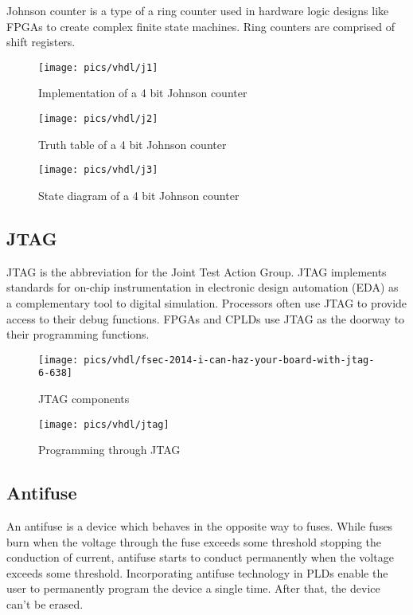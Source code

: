 \noindent
Johnson counter is a type of a ring counter used in hardware logic designs like FPGAs to create complex finite state machines. Ring counters are comprised of shift registers.

\begin{figure}[!h]
	\centering
	\texttt{[image: pics/vhdl/j1]}
	\caption{Implementation of a 4 bit Johnson counter}
	\label{fig:j1}
\end{figure}

\begin{figure}[!h]
	\centering
	\texttt{[image: pics/vhdl/j2]}
	\caption{Truth table of a 4 bit Johnson counter }
	\label{fig:j2}
\end{figure}

\begin{figure}[!h]
	\centering
	\texttt{[image: pics/vhdl/j3]}
	\caption{State diagram of a 4 bit Johnson counter}
	\label{fig:j3}
\end{figure}

\pagebreak

\subsection{JTAG}

\noindent
JTAG is the abbreviation for the Joint Test Action Group. JTAG implements standards for on-chip instrumentation in electronic design automation (EDA) as a complementary tool to digital simulation. Processors often use JTAG to provide access to their debug functions. FPGAs and CPLDs use JTAG as the doorway to their programming functions. 

\begin{figure}[!h]
	\centering
	\texttt{[image: pics/vhdl/fsec-2014-i-can-haz-your-board-with-jtag-6-638]}
	\caption{JTAG components}
	\label{fig:fsec-2014-i-can-haz-your-board-with-jtag-6-638}
\end{figure}

\begin{figure}[!h]
	\centering
	\texttt{[image: pics/vhdl/jtag]}
	\caption{Programming through JTAG}
	\label{fig:jtag}
\end{figure}

\subsection{Antifuse}

\noindent
An antifuse is a device which behaves in the opposite way to fuses. While fuses burn  when the voltage through the fuse exceeds some threshold stopping the conduction of current, antifuse starts to conduct permanently when the voltage exceeds some threshold. Incorporating antifuse technology in PLDs enable the user to permanently program the device a single time. After that, the device can't be erased.

